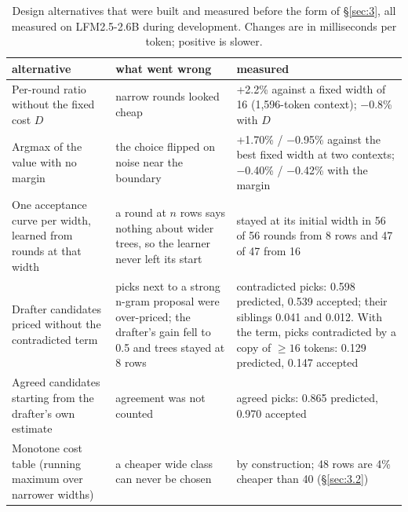 \documentclass[10pt,twocolumn,letterpaper]{article}
\begin{document}
\begin{table}[t]
\centering\small
\caption{Design alternatives that were built and measured before the form of \S\ref{sec:3}, all measured on LFM2.5-2.6B during development. Changes are in milliseconds per token; positive is slower.}
\label{tab:rejected}
\setlength{\tabcolsep}{4pt}
\begin{tabularx}{\textwidth}{XXX}
\toprule
\rowcolor{head}\textbf{alternative} & \textbf{what went wrong} & \textbf{measured} \\
\midrule
Per-round ratio without the fixed cost $D$ & narrow rounds looked cheap & +2.2\% against a fixed width of 16 (1,596-token context); $-$0.8\% with $D$ \\
Argmax of the value with no margin & the choice flipped on noise near the boundary & +1.70\% / $-$0.95\% against the best fixed width at two contexts; $-$0.40\% / $-$0.42\% with the margin \\
One acceptance curve per width, learned from rounds at that width & a round at $n$ rows says nothing about wider trees, so the learner never left its start & stayed at its initial width in 56 of 56 rounds from 8 rows and 47 of 47 from 16 \\
Drafter candidates priced without the contradicted term & picks next to a strong n-gram proposal were over-priced; the drafter's gain fell to 0.5 and trees stayed at 8 rows & contradicted picks: 0.598 predicted, 0.539 accepted; their siblings 0.041 and 0.012. With the term, picks contradicted by a copy of $ \geq 16$ tokens: 0.129 predicted, 0.147 accepted \\
Agreed candidates starting from the drafter's own estimate & agreement was not counted & agreed picks: 0.865 predicted, 0.970 accepted \\
Monotone cost table (running maximum over narrower widths) & a cheaper wide class can never be chosen & by construction; 48 rows are 4\% cheaper than 40 (\S\ref{sec:3.2}) \\
\bottomrule
\end{tabularx}
\end{table}
\end{document}
